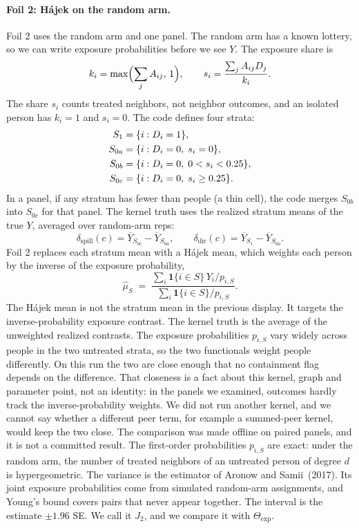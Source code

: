 \documentclass[11pt]{article}
\newcommand{\expset}{\mathrm{exp}}
\newcommand{\Jtwo}{J_2}
\newcommand{\dspill}{\delta_{\mathrm{spill}}}
\newcommand{\ddir}{\delta_{\mathrm{dir}}}
\begin{document}
\paragraph{Foil 2: Hájek on the random arm.}
Foil 2 uses the random arm and one panel. The random arm has a known
lottery, so we can write exposure probabilities before we see $Y$. The
exposure share is
\begin{equation}
  k_i=\max\Bigl(\sum_j A_{ij},\,1\Bigr),\qquad
  s_i=\frac{\sum_{j}A_{ij}D_j}{k_i}.
\end{equation}
The share $s_i$ counts treated neighbors, not neighbor outcomes, and an
isolated person has $k_i=1$ and $s_i=0$. The code defines four strata:
\begin{align*}
  S_1  &= \{i:D_i=1\}, \\
  S_{0a} &= \{i:D_i=0,\; s_i=0\}, \\
  S_{0b} &= \{i:D_i=0,\; 0<s_i<0.25\}, \\
  S_{0c} &= \{i:D_i=0,\; s_i\ge 0.25\}.
\end{align*}
In a panel, if any stratum has fewer than \StratumMinN{} people (a thin cell), the
code merges $S_{0b}$ into $S_{0c}$ for that panel. The kernel truth
uses the realized stratum means of the true $Y$, averaged over \RepsEstimand{}
random-arm reps:
\begin{equation}
  \dspill(c)=\overline{Y}_{S_{0c}}-\overline{Y}_{S_{0a}},\qquad
  \ddir(c)=\overline{Y}_{S_1}-\overline{Y}_{S_{0a}}.
\end{equation}
Foil 2 replaces each stratum mean with a Hájek mean, which weights each
person by the inverse of the exposure probability,
\begin{equation}
  \widehat\mu_S
  \;=\;
  \frac{\sum_i \mathbf{1}\{i\in S\}\,Y_i/p_{i,S}}
       {\sum_i \mathbf{1}\{i\in S\}/p_{i,S}}.
\end{equation}
The Hájek mean is not the stratum mean in the previous display. It targets
the inverse-probability exposure contrast. The kernel truth is the average
of the unweighted realized contrasts. The exposure probabilities $p_{i,S}$
vary widely across people in the two untreated strata, so the two
functionals weight people differently. On this run the two are close
enough that no containment flag depends on the difference. That closeness
is a fact about this kernel, graph and parameter point, not an identity:
in the panels we examined, outcomes hardly track the inverse-probability
weights. We did not run another kernel, and we cannot say whether a
different peer term, for example a summed-peer kernel, would keep the two
close. The comparison was made offline on paired panels, and it is not a
committed result.
The first-order probabilities $p_{i,S}$ are exact: under the random arm, the
number of treated neighbors of an untreated person of degree $d$ is
hypergeometric. The variance is the estimator of Aronow and
Samii~(2017). Its joint exposure probabilities come from
\ExposureDraws{} simulated random-arm assignments, and Young's bound
covers pairs that never appear together. The interval is the estimate
$\pm1.96$ SE. We call it $\Jtwo$, and we compare it with $\Theta_{\expset}$.
\end{document}
